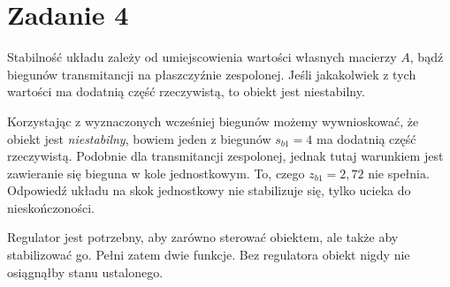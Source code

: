 \section{Zadanie 4} 
Stabilność układu zależy od umiejscowienia wartości własnych macierzy $A$, bądź biegunów transmitancji na płaszczyźnie zespolonej.
Jeśli jakakolwiek z tych wartości ma dodatnią część rzeczywistą, to obiekt jest niestabilny. 

Korzystając z wyznaczonych wcześniej biegunów możemy wywnioskować, że obiekt jest \emph{niestabilny}, bowiem jeden z biegunów $s_{b1}=4$ ma dodatnią część rzeczywistą.
Podobnie dla transmitancji zespolonej, jednak tutaj warunkiem jest zawieranie się bieguna w kole jednostkowym. To, czego $z_{b1} = 2,72$ nie spełnia.
Odpowiedź układu na skok jednostkowy nie stabilizuje się, tylko ucieka do nieskończoności.

Regulator jest potrzebny, aby zarówno sterować obiektem, ale także aby stabilizować go. Pełni zatem dwie funkcje.
Bez regulatora obiekt nigdy nie osiągnąłby stanu ustalonego.